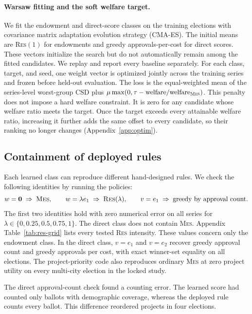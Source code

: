 \documentclass{article}
\newcommand{\MES}{\textsc{Mes}}
\newcommand{\RES}{\textsc{Res}}
\newcommand{\csd}{\mathrm{CSD}}
\begin{document}
\paragraph{Warsaw fitting and the soft welfare target.}
We fit the endowment and direct-score classes on the training elections with
covariance matrix adaptation evolution strategy (CMA-ES). The initial means are
\RES$(1)$ for endowments and greedy approvals-per-cost for direct scores. These
vectors initialize the search but do not automatically remain among the fitted
candidates. We replay and report every baseline separately. For each class,
target, and seed, one weight vector is optimized jointly across the training
series and frozen before held-out evaluation. The loss is the equal-weighted mean of the
series-level worst-group $\csd$ plus
$\mu \max(0, \tau - \text{welfare}/\text{welfare}_{\MES})$. This penalty
does not impose a hard welfare constraint. It is zero for any
candidate whose welfare ratio meets the target. Once the target exceeds every
attainable welfare ratio, increasing it further adds the same offset to every
candidate, so their ranking no longer changes (Appendix~\ref{app:optim}).

\subsection{Containment of deployed rules}
\label{sec:containment}

Each learned class can reproduce different hand-designed rules. We check the
following identities by running the policies:
\[
w = \mathbf{0} \;\Rightarrow\; \MES, \qquad
w = \lambda e_1 \;\Rightarrow\; \RES(\lambda), \qquad
v = e_1 \;\Rightarrow\; \text{greedy by approval count}.
\]
The first two identities hold with zero numerical error on all
\NumSeriesTotal{} series for
$\lambda \in \{0, 0.25, 0.5, 0.75, 1\}$. The direct class does not contain
\MES{}. Appendix Table~\ref{tab:res-grid} lists every tested \RES{} intensity.
These values concern only the endowment class. In the direct class, $v=e_1$ and
$v=e_2$ recover greedy approval count and greedy approvals per cost, with exact
winner-set equality on all \PrimaryElectionN{} elections. The project-priority
code also reproduces ordinary \MES{} at zero project utility on every
multi-city election in the locked study.

The direct approval-count check found a counting error. The learned score had
counted only ballots with demographic coverage, whereas the deployed rule
counts every ballot. This difference reordered projects in four elections.
\end{document}
